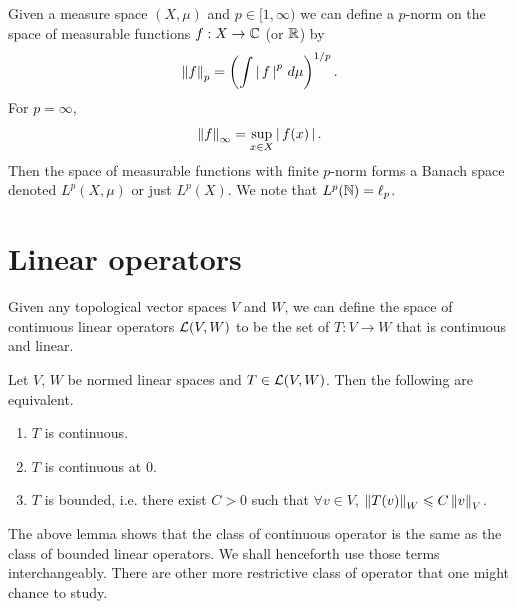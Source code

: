 \documentclass{article}
\begin{document}
\begin{mdframed}
\begin{example}[$L^p(X, \mu)$] Given a measure space $(X, \mu)$ and $p \in [1, \infty)$ we can define a $p$-norm on the space of measurable functions $f: X \to \C$ (or $\R$) by 
\begin{align*}
\norm[f]_p = \brac{\int \abs{f}^p \, d\mu }^{1/p}. 
\end{align*}
For $p = \infty$, 
\begin{align*}
\norm[f]_\infty = \sup_{x \in X} \abs{f(x)}. 
\end{align*}
Then the space of measurable functions with finite $p$-norm forms a Banach space denoted $L^p(X, \mu)$ or just $L^p(X)$.  We note that $L^p(\N) = \ell_p$. 
\end{example}
\end{mdframed} 



\section{Linear operators}
Given any topological vector spaces $V$ and $W$, we can define the space of continuous linear operators $\L(V, W)$ to be the set of $T: V \to W$ that is continuous and linear. 
\begin{flemma} Let $V$, $W$ be normed linear spaces and $T \in \L(V, W)$. Then the following are equivalent. 
\begin{enumerate}
\item $T$ is continuous. 
\item $T$ is continuous at $0$. 
\item $T$ is bounded, i.e. there exist $C > 0$ such that $\forall v \in V$, $\norm[T(v)]_W \leq C \norm[v]_V$. 
\end{enumerate}
\end{flemma}
The above lemma shows that the class of continuous operator is the same as the class of bounded linear operators. We shall henceforth use those terms interchangeably. There are other more restrictive class of operator that one might chance to study. 
\end{document}
